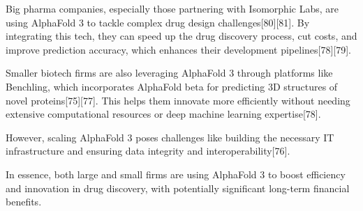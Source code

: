 \begin{showcase}[title=Topic: AlphaFold 3]
Big pharma companies, especially those partnering with Isomorphic Labs, are using AlphaFold 3 to tackle complex drug design challenges[80][81]. By integrating this tech, they can speed up the drug discovery process, cut costs, and improve prediction accuracy, which enhances their development pipelines[78][79].

Smaller biotech firms are also leveraging AlphaFold 3 through platforms like Benchling, which incorporates AlphaFold beta for predicting 3D structures of novel proteins[75][77]. This helps them innovate more efficiently without needing extensive computational resources or deep machine learning expertise[78].

However, scaling AlphaFold 3 poses challenges like building the necessary IT infrastructure and ensuring data integrity and interoperability[76].

In essence, both large and small firms are using AlphaFold 3 to boost efficiency and innovation in drug discovery, with potentially significant long-term financial benefits.
\end{showcase}